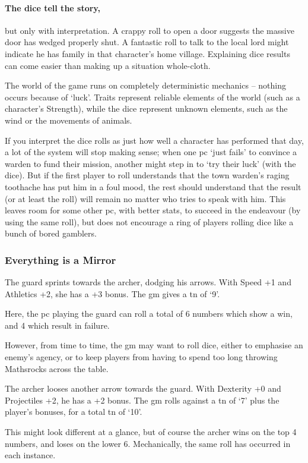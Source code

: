 \begin{multicols}{2}
\paragraph{The dice tell the story,} but only with interpretation.
A crappy roll to open a door suggests the massive door has wedged properly shut.
A fantastic roll to talk to the local lord might indicate he has family in that character's home \gls{village}.
Explaining dice results can come easier than making up a situation whole-cloth.

The world of the game runs on completely deterministic mechanics -- nothing occurs because of `luck'.
Traits represent reliable elements of the world (such as a character's Strength), while the dice represent unknown elements, such as the wind or the movements of animals.

If you interpret the dice rolls as just how well a character has performed that day, a lot of the system will stop making sense; when one \gls{pc} `just fails' to convince a warden to fund their mission, another might step in to `try their luck' (with the dice).
But if the first player to roll understands that the town warden's raging toothache has put him in a foul mood, the rest should understand that the result (or at least the roll) will remain no matter who tries to speak with him.
This leaves room for some other \gls{pc}, with better stats, to succeed in the endeavour (by using the same roll), but does not encourage a ring of players rolling dice like a bunch of bored gamblers.

\subsubsection{Everything is a Mirror}

\begin{exampletext}
  The guard sprints towards the archer, dodging his arrows.
  With Speed +1 and Athletics +2, she has a +3 bonus.
  The \gls{gm} gives a \gls{tn} of `9'.
\end{exampletext}

\noindent
Here, the \gls{pc} playing the guard can roll a total of 6 numbers which show a win, and 4 which result in failure.

However, from time to time, the \gls{gm} may want to roll dice, either to emphasise an enemy's agency, or to keep players from having to spend too long throwing Mathsrocks across the table.

\begin{exampletext}
  The archer looses another arrow towards the guard.
  With Dexterity +0 and Projectiles +2, he has a +2 bonus.
  The \gls{gm} rolls against a \gls{tn} of `7' plus the player's bonuses, for a total \gls{tn} of `10'.
\end{exampletext}

\noindent
This might look different at a glance, but of course the archer wins on the top 4 numbers, and loses on the lower 6.
Mechanically, the same roll has occurred in each instance.

\end{multicols}


